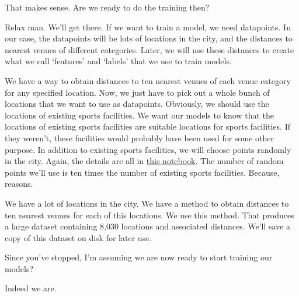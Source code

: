 {\color{blue} That makes sense. Are we ready to do the training then? }

Relax man. We'll get there. If we want to train a model, we need datapoints. In our case, the datapoints will be lots of locations in the city, and the distances to nearest venues of different categories. Later, we will use these distances to create what we call `features' and `labels' that we use to train models. 

We have a way to obtain distances to ten nearest venues of each venue category for any specified location. Now, we just have to pick out a whole bunch of locations that we want to use as datapoints. Obviously, we should use the locations of existing sports facilities. We want our models to know that the locations of existing sports facilities are suitable locations for sports facilities. If they weren't, these facilities would probably have been used for some other purpose. In addition to existing sports facilities, we will choose points randomly in the city. Again, the details are all in \href{https://github.com/saba-vadarevu/IBM-dataScience-Capstone/blob/master/final/preprocessing.ipynb}{this notebook}. The number of random points we'll use is ten times the number of existing sports facilities. Because, reasons.

We have a lot of locations in the city. We have a method to obtain distances to ten nearest venues for each of this locations. We use this method. That produces a large dataset containing 8,030 locations and associated distances. We'll save a copy of this dataset on disk for later use. 

{\color{blue} Since you've stopped, I'm assuming we are now ready to start training our models?}

Indeed we are.
